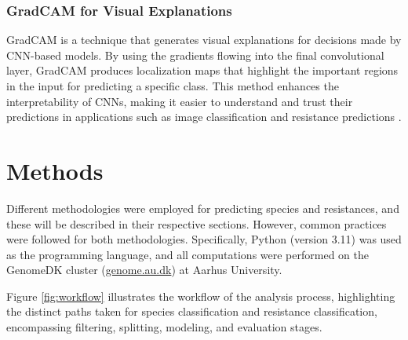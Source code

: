 \documentclass[english,11pt,a4paper,titlepage]{article}
\begin{document}
	\subsubsection*{GradCAM for Visual Explanations}
	GradCAM is a technique that generates visual explanations for decisions made by CNN-based models. By using the gradients flowing into the final convolutional layer, GradCAM produces localization maps that highlight the important regions in the input for predicting a specific class. This method enhances the interpretability of CNNs, making it easier to understand and trust their predictions in applications such as image classification and  resistance predictions \cite{selvarajuGradCAMVisualExplanations2020}.
		
\clearpage
\section*{Methods}
	Different methodologies were employed for predicting species and resistances, and these will be described in their respective sections. However, common practices were followed for both methodologies. Specifically, Python (version 3.11) \cite{python} was used as the programming language, and all computations were performed on the GenomeDK cluster (\url{genome.au.dk}) at Aarhus University.

	Figure \ref{fig:workflow} illustrates the workflow of the analysis process, highlighting the distinct paths taken for species classification and resistance classification, encompassing filtering, splitting, modeling, and evaluation stages.
\end{document}
